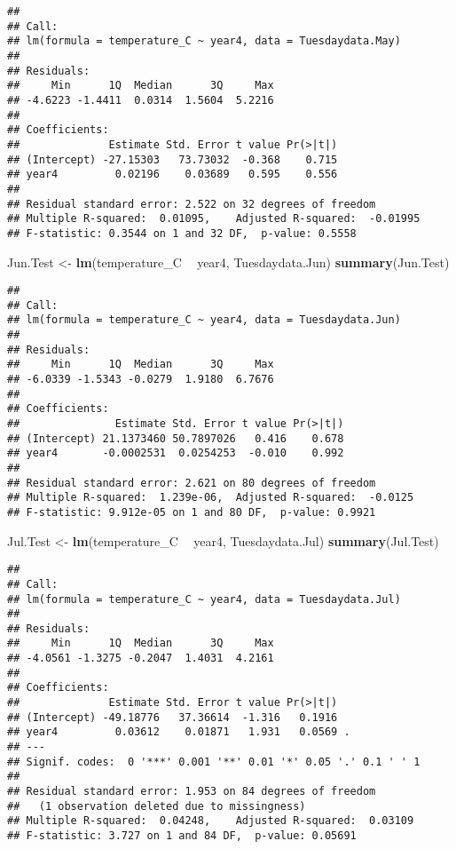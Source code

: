 \documentclass[]{article}
\newenvironment{Shaded}{\begin{snugshade}}{\end{snugshade}}
\newcommand{\KeywordTok}[1]{\textcolor[rgb]{0.13,0.29,0.53}{\textbf{#1}}}
\newcommand{\NormalTok}[1]{#1}
\newcommand{\OperatorTok}[1]{\textcolor[rgb]{0.81,0.36,0.00}{\textbf{#1}}}
\newcommand{\StringTok}[1]{\textcolor[rgb]{0.31,0.60,0.02}{#1}}
\begin{document}
\begin{verbatim}
## 
## Call:
## lm(formula = temperature_C ~ year4, data = Tuesdaydata.May)
## 
## Residuals:
##     Min      1Q  Median      3Q     Max 
## -4.6223 -1.4411  0.0314  1.5604  5.2216 
## 
## Coefficients:
##              Estimate Std. Error t value Pr(>|t|)
## (Intercept) -27.15303   73.73032  -0.368    0.715
## year4         0.02196    0.03689   0.595    0.556
## 
## Residual standard error: 2.522 on 32 degrees of freedom
## Multiple R-squared:  0.01095,    Adjusted R-squared:  -0.01995 
## F-statistic: 0.3544 on 1 and 32 DF,  p-value: 0.5558
\end{verbatim}

\begin{Shaded}
\begin{Highlighting}[]
\NormalTok{Jun.Test <-}\StringTok{ }\KeywordTok{lm}\NormalTok{(temperature_C }\OperatorTok{~}\StringTok{ }\NormalTok{year4, Tuesdaydata.Jun)}
\KeywordTok{summary}\NormalTok{(Jun.Test)}
\end{Highlighting}
\end{Shaded}

\begin{verbatim}
## 
## Call:
## lm(formula = temperature_C ~ year4, data = Tuesdaydata.Jun)
## 
## Residuals:
##     Min      1Q  Median      3Q     Max 
## -6.0339 -1.5343 -0.0279  1.9180  6.7676 
## 
## Coefficients:
##               Estimate Std. Error t value Pr(>|t|)
## (Intercept) 21.1373460 50.7897026   0.416    0.678
## year4       -0.0002531  0.0254253  -0.010    0.992
## 
## Residual standard error: 2.621 on 80 degrees of freedom
## Multiple R-squared:  1.239e-06,  Adjusted R-squared:  -0.0125 
## F-statistic: 9.912e-05 on 1 and 80 DF,  p-value: 0.9921
\end{verbatim}

\begin{Shaded}
\begin{Highlighting}[]
\NormalTok{Jul.Test <-}\StringTok{ }\KeywordTok{lm}\NormalTok{(temperature_C }\OperatorTok{~}\StringTok{ }\NormalTok{year4, Tuesdaydata.Jul)}
\KeywordTok{summary}\NormalTok{(Jul.Test)}
\end{Highlighting}
\end{Shaded}

\begin{verbatim}
## 
## Call:
## lm(formula = temperature_C ~ year4, data = Tuesdaydata.Jul)
## 
## Residuals:
##     Min      1Q  Median      3Q     Max 
## -4.0561 -1.3275 -0.2047  1.4031  4.2161 
## 
## Coefficients:
##              Estimate Std. Error t value Pr(>|t|)  
## (Intercept) -49.18776   37.36614  -1.316   0.1916  
## year4         0.03612    0.01871   1.931   0.0569 .
## ---
## Signif. codes:  0 '***' 0.001 '**' 0.01 '*' 0.05 '.' 0.1 ' ' 1
## 
## Residual standard error: 1.953 on 84 degrees of freedom
##   (1 observation deleted due to missingness)
## Multiple R-squared:  0.04248,    Adjusted R-squared:  0.03109 
## F-statistic: 3.727 on 1 and 84 DF,  p-value: 0.05691
\end{verbatim}
\end{document}
